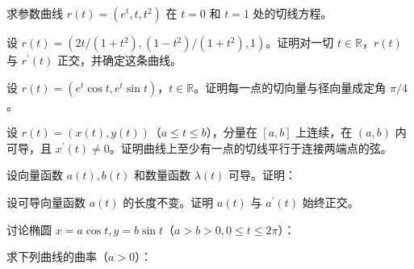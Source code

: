 \newpage
\noindent\begin{minipage}{\textwidth}
求参数曲线 $r(t)=(e^t,t,t^2)$ 在 $t=0$ 和 $t=1$ 处的切线方程。
\end{minipage}\par\vfill
\noindent\begin{minipage}{\textwidth}
设 $r(t)=(2t/(1+t^2),(1-t^2)/(1+t^2),1)$。证明对一切 $t\in\mathbb R$，$r(t)$ 与 $r^{\prime}(t)$ 正交，并确定这条曲线。
\end{minipage}\par\vfill
\noindent\begin{minipage}{\textwidth}
设 $r(t)=(e^t\cos t,e^t\sin t)$，$t\in\mathbb R$。证明每一点的切向量与径向量成定角 $\pi/4$。
\end{minipage}\par\vfill
\newpage
\noindent\begin{minipage}{\textwidth}
设 $r(t)=(x(t),y(t))$（$a\le t\le b$），分量在 $[a,b]$ 上连续，在 $(a,b)$ 内可导，且 $x^{\prime}(t)\ne0$。证明曲线上至少有一点的切线平行于连接两端点的弦。
\end{minipage}\par\vfill
\noindent\begin{minipage}{\textwidth}
设向量函数 $a(t),b(t)$ 和数量函数 $\lambda(t)$ 可导。证明：
\end{minipage}\par\vfill
\noindent\begin{minipage}{\textwidth}
设可导向量函数 $a(t)$ 的长度不变。证明 $a(t)$ 与 $a^{\prime}(t)$ 始终正交。
\end{minipage}\par\vfill
\newpage
\noindent\begin{minipage}{\textwidth}
讨论椭圆 $x=a\cos t,y=b\sin t$（$a>b>0,0\le t\le2\pi$）：
\end{minipage}\par\vfill
\noindent\begin{minipage}{\textwidth}
求下列曲线的曲率（$a>0$）：
\end{minipage}\par\vfill
